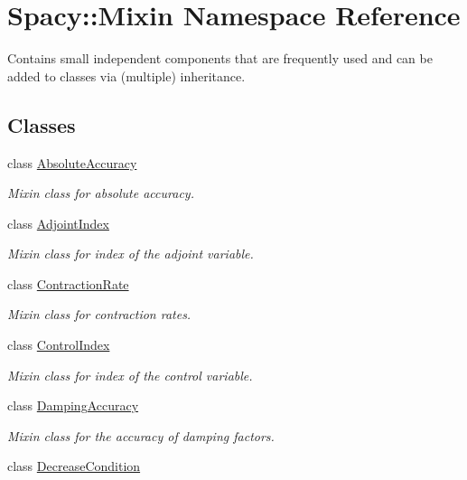\hypertarget{namespaceSpacy_1_1Mixin}{}\section{Spacy\+:\+:Mixin Namespace Reference}
\label{namespaceSpacy_1_1Mixin}


Contains small independent components that are frequently used and can be added to classes via (multiple) inheritance.  


\subsection*{Classes}
\begin{DoxyCompactItemize}
\item 
class \hyperlink{classSpacy_1_1Mixin_1_1AbsoluteAccuracy}{Absolute\+Accuracy}
\begin{DoxyCompactList}\small\item\em Mixin class for absolute accuracy. \end{DoxyCompactList}\item 
class \hyperlink{classSpacy_1_1Mixin_1_1AdjointIndex}{Adjoint\+Index}
\begin{DoxyCompactList}\small\item\em Mixin class for index of the adjoint variable. \end{DoxyCompactList}\item 
class \hyperlink{classSpacy_1_1Mixin_1_1ContractionRate}{Contraction\+Rate}
\begin{DoxyCompactList}\small\item\em Mixin class for contraction rates. \end{DoxyCompactList}\item 
class \hyperlink{classSpacy_1_1Mixin_1_1ControlIndex}{Control\+Index}
\begin{DoxyCompactList}\small\item\em Mixin class for index of the control variable. \end{DoxyCompactList}\item 
class \hyperlink{classSpacy_1_1Mixin_1_1DampingAccuracy}{Damping\+Accuracy}
\begin{DoxyCompactList}\small\item\em Mixin class for the accuracy of damping factors. \end{DoxyCompactList}\item 
class \hyperlink{classSpacy_1_1Mixin_1_1DecreaseCondition}{Decrease\+Condition}

\end{DoxyCompactItemize}
